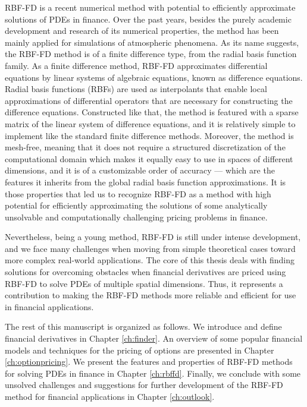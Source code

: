 \documentclass{UUThesisTemplate}
\begin{document}
\par
RBF-FD is a recent numerical method with potential to efficiently approximate solutions of PDEs in finance. Over the past years, besides the purely academic development and research of its numerical properties, the method has been mainly applied for simulations of atmospheric phenomena. As its name suggests, the RBF-FD method is of a finite difference type, from the radial basis function family. As a finite difference method, RBF-FD approximates differential equations by linear systems of algebraic equations, known as difference equations. Radial basis functions (RBFs) are used as interpolants that enable local approximations of differential operators that are necessary for constructing the difference equations. Constructed like that, the method is featured with a sparse matrix of the linear system of difference equations, and it is relatively simple to implement like the standard finite difference methods. Moreover, the method is mesh-free, meaning that it does not require a structured discretization of the computational domain which makes it equally easy to use in spaces of different dimensions, and it is of a customizable order of accuracy --- which are the features it inherits from the global radial basis function approximations. It is those properties that led us to recognize RBF-FD as a method with high potential for efficiently approximating the solutions of some analytically unsolvable and computationally challenging pricing problems in finance.

\par
Nevertheless, being a young method, RBF-FD is still under intense development, and we face many challenges when moving from simple theoretical cases toward more complex real-world applications. The core of this thesis deals with finding solutions for overcoming obstacles when financial derivatives are priced using RBF-FD to solve PDEs of multiple spatial dimensions. Thus, it represents a contribution to making the RBF-FD methods more reliable and efficient for use in financial applications. 

\par
The rest of this manuscript is organized as follows. We introduce and define financial derivatives in Chapter \ref{ch:finder}. An overview of some popular financial models and techniques for the pricing of options are presented in Chapter \ref{ch:optionpricing}. We present the features and properties of RBF-FD methods for solving PDEs in finance in Chapter \ref{ch:rbffd}. Finally, we conclude with some unsolved challenges and suggestions for further development of the RBF-FD method for financial applications in Chapter \ref{ch:outlook}.
%
%
\end{document}
